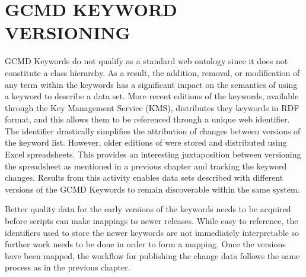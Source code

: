 
\chapter{GCMD KEYWORD VERSIONING}

GCMD Keywords do not qualify as a standard web ontology since it does not constitute a class hierarchy.
As a result, the addition, removal, or modification of any term within the keywords has a significant impact on the semantics of using a keyword to describe a data set.
More recent editions of the keywords, available through the Key Management Service (KMS), distributes they keywords in RDF format, and this allows them to be referenced through a unique web identifier.
The identifier drastically simplifies the attribution of changes between versions of the keyword list.
However, older editions of were stored and distributed using Excel spreadsheets.
This provides an interesting juxtaposition between versioning the spreadsheet as mentioned in a previous chapter and tracking the keyword changes.
Results from this activity enables data sets described with different versions of the GCMD Keywords to remain discoverable within the same system.

Better quality data for the early versions of the keywords needs to be acquired before scripts can make mappings to newer releases.
While easy to reference, the identifiers used to store the newer keywords are not immediately interpretable so further work needs to be done in order to form a mapping.
Once the versions have been mapped, the workflow for publishing the change data follows the same process as in the previous chapter.